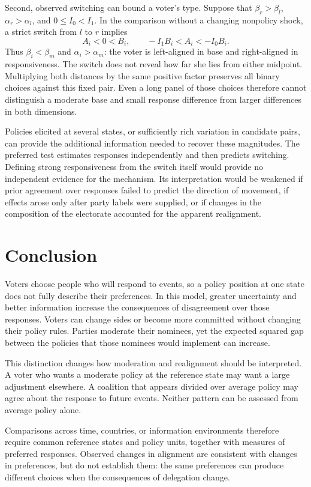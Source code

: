 \documentclass[12pt,letterpaper]{article}
\begin{document}
Second, observed switching can bound a voter's type. Suppose that $\beta_r>\beta_l$, $\alpha_r>\alpha_l$, and $0\le I_0<I_1$. In the comparison without a changing nonpolicy shock, a strict switch from $l$ to $r$ implies
\[
A_i<0<B_i,
\qquad
-I_1B_i<A_i<-I_0B_i.
\]
Thus $\beta_i<\beta_m$ and $\alpha_i>\alpha_m$: the voter is left-aligned in base and right-aligned in responsiveness. The switch does not reveal how far she lies from either midpoint. Multiplying both distances by the same positive factor preserves all binary choices against this fixed pair. Even a long panel of those choices therefore cannot distinguish a moderate base and small response difference from larger differences in both dimensions.

Policies elicited at several states, or sufficiently rich variation in candidate pairs, can provide the additional information needed to recover these magnitudes. The preferred test estimates responses independently and then predicts switching. Defining strong responsiveness from the switch itself would provide no independent evidence for the mechanism. Its interpretation would be weakened if prior agreement over responses failed to predict the direction of movement, if effects arose only after party labels were supplied, or if changes in the composition of the electorate accounted for the apparent realignment.

\section{Conclusion}\label{sec:conclusion}

Voters choose people who will respond to events, so a policy position at one state does not fully describe their preferences. In this model, greater uncertainty and better information increase the consequences of disagreement over those responses. Voters can change sides or become more committed without changing their policy rules. Parties moderate their nominees, yet the expected squared gap between the policies that those nominees would implement can increase.

This distinction changes how moderation and realignment should be interpreted. A voter who wants a moderate policy at the reference state may want a large adjustment elsewhere. A coalition that appears divided over average policy may agree about the response to future events. Neither pattern can be assessed from average policy alone.

Comparisons across time, countries, or information environments therefore require common reference states and policy units, together with measures of preferred responses. Observed changes in alignment are consistent with changes in preferences, but do not establish them: the same preferences can produce different choices when the consequences of delegation change.
\end{document}
